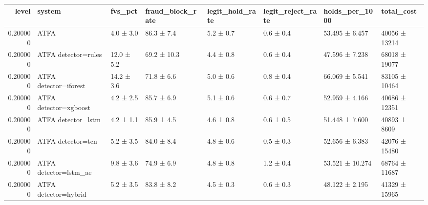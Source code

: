 \begin{tabular}{rlllllll}
\toprule
level & system & fvs\_pct & fraud\_block\_rate & legit\_hold\_rate & legit\_reject\_rate & holds\_per\_1000 & total\_cost \\
\midrule
0.200000 & ATFA & 4.0 ± 3.0 & 86.3 ± 7.4 & 5.2 ± 0.7 & 0.6 ± 0.4 & 53.495 ± 6.457 & 40056 ± 13214 \\
0.200000 & ATFA detector=rules & 12.0 ± 5.2 & 69.2 ± 10.3 & 4.4 ± 0.8 & 0.6 ± 0.4 & 47.596 ± 7.238 & 68018 ± 19077 \\
0.200000 & ATFA detector=iforest & 14.2 ± 3.6 & 71.8 ± 6.6 & 5.0 ± 0.6 & 0.8 ± 0.4 & 66.069 ± 5.541 & 83105 ± 10464 \\
0.200000 & ATFA detector=xgboost & 4.2 ± 2.5 & 85.7 ± 6.9 & 5.1 ± 0.6 & 0.6 ± 0.7 & 52.959 ± 4.166 & 40686 ± 12351 \\
0.200000 & ATFA detector=lstm & 4.2 ± 1.1 & 85.9 ± 4.5 & 4.6 ± 0.8 & 0.6 ± 0.5 & 51.448 ± 7.600 & 40893 ± 8609 \\
0.200000 & ATFA detector=tcn & 5.2 ± 3.5 & 84.0 ± 8.4 & 4.8 ± 0.6 & 0.5 ± 0.3 & 52.656 ± 6.383 & 42076 ± 15480 \\
0.200000 & ATFA detector=lstm\_ae & 9.8 ± 3.6 & 74.9 ± 6.9 & 4.8 ± 0.8 & 1.2 ± 0.4 & 53.521 ± 10.274 & 68764 ± 11687 \\
0.200000 & ATFA detector=hybrid & 5.2 ± 3.5 & 83.8 ± 8.2 & 4.5 ± 0.3 & 0.6 ± 0.3 & 48.122 ± 2.195 & 41329 ± 15965 \\
\bottomrule
\end{tabular}

